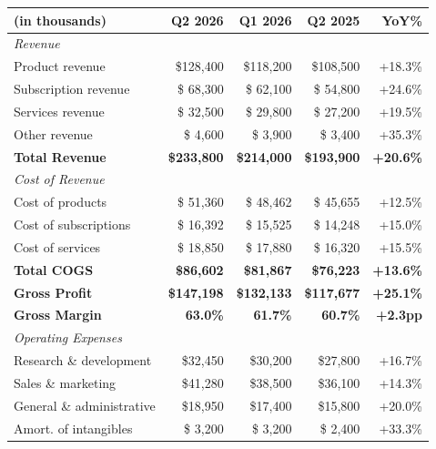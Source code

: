 \documentclass[
    language=english,
    doctype=financial-report,
    institution=none,
]{../../omnilatex}
\begin{document}
\begin{table}[h]
    \centering
    \begin{tabular}{lrrrr}
        \toprule
        \textbf{(in thousands)} & \textbf{Q2 2026} & \textbf{Q1 2026} & \textbf{Q2 2025} & \textbf{YoY\%} \\
        \midrule
        \multicolumn{5}{l}{\textit{Revenue}} \\
        \quad Product revenue       & \$128,400 & \$118,200 & \$108,500 & +18.3\% \\
        \quad Subscription revenue  & \$ 68,300 & \$ 62,100 & \$ 54,800 & +24.6\% \\
        \quad Services revenue      & \$ 32,500 & \$ 29,800 & \$ 27,200 & +19.5\% \\
        \quad Other revenue         & \$  4,600 & \$  3,900 & \$  3,400 & +35.3\% \\
        \midrule
        \textbf{Total Revenue}      & \textbf{\$233,800} & \textbf{\$214,000} & \textbf{\$193,900} & \textbf{+20.6\%} \\
        \midrule
        \multicolumn{5}{l}{\textit{Cost of Revenue}} \\
        \quad Cost of products      & \$ 51,360 & \$ 48,462 & \$ 45,655 & +12.5\% \\
        \quad Cost of subscriptions & \$ 16,392 & \$ 15,525 & \$ 14,248 & +15.0\% \\
        \quad Cost of services      & \$ 18,850 & \$ 17,880 & \$ 16,320 & +15.5\% \\
        \midrule
        \textbf{Total COGS}         & \textbf{\$86,602} & \textbf{\$81,867} & \textbf{\$76,223} & \textbf{+13.6\%} \\
        \midrule
        \textbf{Gross Profit}       & \textbf{\$147,198} & \textbf{\$132,133} & \textbf{\$117,677} & \textbf{+25.1\%} \\
        \textbf{Gross Margin}       & \textbf{63.0\%} & \textbf{61.7\%} & \textbf{60.7\%} & \textbf{+2.3pp} \\
        \midrule
        \multicolumn{5}{l}{\textit{Operating Expenses}} \\
        \quad Research \& development & \$32,450 & \$30,200 & \$27,800 & +16.7\% \\
        \quad Sales \& marketing      & \$41,280 & \$38,500 & \$36,100 & +14.3\% \\
        \quad General \& administrative & \$18,950 & \$17,400 & \$15,800 & +20.0\% \\
        \quad Amort. of intangibles   & \$ 3,200 & \$ 3,200 & \$ 2,400 & +33.3\% \\

\end{tabular}
\end{table}
\end{document}
